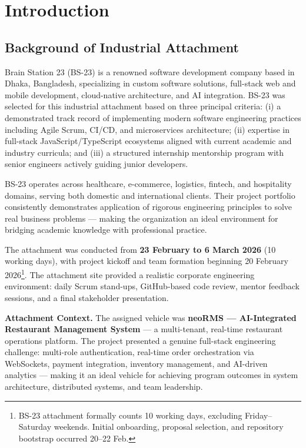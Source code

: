 \chapter{Introduction}
\label{ch:intro}

\section{Background of Industrial Attachment}
\label{sec:background}

Brain Station 23 (BS-23) is a renowned software development company based in Dhaka, Bangladesh, specializing in custom software solutions, full-stack web and mobile development, cloud-native architecture, and AI integration. BS-23 was selected for this industrial attachment based on three principal criteria: (i) a demonstrated track record of implementing modern software engineering practices including Agile Scrum, CI/CD, and microservices architecture; (ii) expertise in full-stack JavaScript/TypeScript ecosystems aligned with current academic and industry curricula; and (iii) a structured internship mentorship program with senior engineers actively guiding junior developers.

BS-23 operates across healthcare, e-commerce, logistics, fintech, and hospitality domains, serving both domestic and international clients. Their project portfolio consistently demonstrates application of rigorous engineering principles to solve real business problems --- making the organization an ideal environment for bridging academic knowledge with professional practice.

The attachment was conducted from \textbf{23 February to 6 March 2026} (10 working days), with project kickoff and team formation beginning 20 February 2026\footnote{BS-23 attachment formally counts 10 working days, excluding Friday--Saturday weekends. Initial onboarding, proposal selection, and repository bootstrap occurred 20--22 Feb.}. The attachment site provided a realistic corporate engineering environment: daily Scrum stand-ups, GitHub-based code review, mentor feedback sessions, and a final stakeholder presentation.

\textbf{Attachment Context.} The assigned vehicle was \textbf{neoRMS --- AI-Integrated Restaurant Management System} --- a multi-tenant, real-time restaurant operations platform. The project presented a genuine full-stack engineering challenge: multi-role authentication, real-time order orchestration via WebSockets, payment integration, inventory management, and AI-driven analytics --- making it an ideal vehicle for achieving program outcomes in system architecture, distributed systems, and team leadership.

